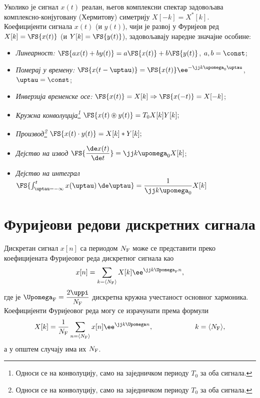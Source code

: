 Уколико је сигнал $x(t)$ реалан, његов комплексни спектар задовољава комплексно-конјуговану (Хермитову) симетрију 
$X[-k] = X^{\ast}[k]$. \\[1mm]

Коефицијенти сигнала $x(t)$ (и $y(t)$), чији је развој у Фуријеов ред
$X[k] = \FS{x(t)}$ (и $Y[k] = \FS{y(t)}$),
задовољавају наредне значајне особине: 
\begin{itemize}\itemsep0pt
    \item \emph{Линеарност:}  $\FS{ax(t) + by(t)} = a \FS{x(t)} + b \FS{y(t)}$, $a,b = \const$;
    \item \emph{Померај у времену:} $ \FS{x(t-\uptau)} = \FS{x(t)} \ee^{-\jj k \upomega_{\rm 0} \uptau}$, $\uptau = \const$;
    \item \emph{Инверзија временске осе:} $\FS{x(t)} = X[k] \Rightarrow \FS{x(-t)} = X[-k] $;
    \item \emph{Кружна конволуција\footnote{Односи се на конволуцију, само на заједничком периоду $T_0$ за оба сигнала.}}
    $
    \FS{x(t) \circledast y(t)} = T_0 X[k] Y[k];
    $
    \item \emph{Производ\footnote{Односи се на конволуцију, само на заједничком периоду $T_0$ за оба сигнала.}}
    $
    \FS{x(t) \cdot y(t)} = X[k] \ast Y[k];
    $
    \item \emph{Дејство на извод} $\FS{ \dfrac{\de x(t)}{\de t} } = \jj k \upomega_0 X[k]$;
    \item \emph{Дејство на интеграл} $\FS{ \int_{\uptau = -\infty}^t x(\uptau) \, \de \uptau } = \dfrac{1}{\jj k \upomega_0} X[k]$
\end{itemize}


\section*{Фуријеови редови дискретних сигнала}

Дискретан сигнал $x[n]$ са периодом $N_{\rm F}$ може се представити преко коефицијената Фуријеовог 
реда дискретног сигнала као
\begin{eqnarray}
    x[n] = \sum_{k = \langle N_{\rm F} \rangle } X[k] \ee^{ \jj k \Upomega_{\rm F} n }, 
\end{eqnarray}
где је $\Upomega_{\rm F} = \dfrac{2\uppi}{N_{\rm F}}$ дискретна кружна учестаност основног хармоника. Коефицијенти 
Фуријеовог реда могу се израчунати према формули 
\begin{equation}
    X[k] = \dfrac{1}{N_{\rm F}} \sum_{n = \langle N_{\rm F} \rangle} x[n] \ee^{\jj k \Upomega n}, 
    \qquad\qquad\qquad
    k = \langle N_{\rm F} \rangle,
\end{equation}
а у општем случају има их $N_{\rm F}$. 


